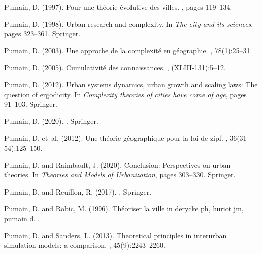 \documentclass[10pt,letterpaper]{article}
\begin{document}
\begin{thebibliography}{}
Pumain, D. (1997).
\newblock Pour une th{\'e}orie {\'e}volutive des villes.
, pages 119--134.

Pumain, D. (1998).
\newblock Urban research and complexity.
\newblock In {\em The city and its sciences}, pages 323--361. Springer.

Pumain, D. (2003).
\newblock Une approche de la complexit{\'e} en g{\'e}ographie.
, 78(1):25--31.

Pumain, D. (2005).
\newblock Cumulativit{\'e} des connaissances.
, (XLIII-131):5--12.

Pumain, D. (2012).
\newblock Urban systems dynamics, urban growth and scaling laws: The question
  of ergodicity.
\newblock In {\em Complexity theories of cities have come of age}, pages
  91--103. Springer.

Pumain, D. (2020).
.
\newblock Springer.

Pumain, D. et~al. (2012).
\newblock Une th{\'e}orie g{\'e}ographique pour la loi de zipf.
, 36(31-54):125--150.

Pumain, D. and Raimbault, J. (2020).
\newblock Conclusion: Perspectives on urban theories.
\newblock In {\em Theories and Models of Urbanization}, pages 303--330.
  Springer.

Pumain, D. and Reuillon, R. (2017).
.
\newblock Springer.

Pumain, D. and Robic, M. (1996).
\newblock Th{\'e}oriser la ville in derycke ph, huriot jm, pumain d.
.

Pumain, D. and Sanders, L. (2013).
\newblock Theoretical principles in interurban simulation models: a comparison.
, 45(9):2243--2260.


\end{thebibliography}
\end{document}
